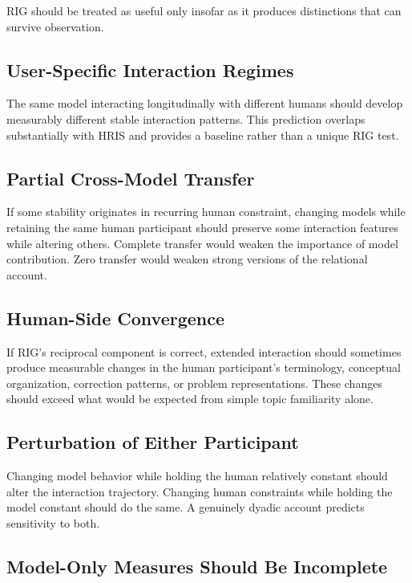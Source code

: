 \documentclass[12pt]{article}
\begin{document}
RIG should be treated as useful only insofar as it produces distinctions that can survive observation.

\subsection{User-Specific Interaction Regimes}

The same model interacting longitudinally with different humans should develop measurably different stable interaction patterns. This prediction overlaps substantially with HRIS and provides a baseline rather than a unique RIG test.

\subsection{Partial Cross-Model Transfer}

If some stability originates in recurring human constraint, changing models while retaining the same human participant should preserve some interaction features while altering others. Complete transfer would weaken the importance of model contribution. Zero transfer would weaken strong versions of the relational account.

\subsection{Human-Side Convergence}

If RIG's reciprocal component is correct, extended interaction should sometimes produce measurable changes in the human participant's terminology, conceptual organization, correction patterns, or problem representations. These changes should exceed what would be expected from simple topic familiarity alone.

\subsection{Perturbation of Either Participant}

Changing model behavior while holding the human relatively constant should alter the interaction trajectory. Changing human constraints while holding the model constant should do the same. A genuinely dyadic account predicts sensitivity to both.

\subsection{Model-Only Measures Should Be Incomplete}
\end{document}

